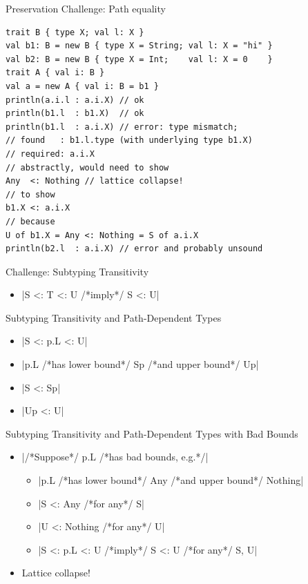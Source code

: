 \documentclass{beamer}
\begin{document}
\begin{frame}[fragile]{Preservation Challenge: Path equality}
\begin{verbatim}
trait B { type X; val l: X }
val b1: B = new B { type X = String; val l: X = "hi" }
val b2: B = new B { type X = Int;    val l: X = 0    }
trait A { val i: B }
val a = new A { val i: B = b1 }
println(a.i.l : a.i.X) // ok
println(b1.l  : b1.X)  // ok
println(b1.l  : a.i.X) // error: type mismatch;
// found   : b1.l.type (with underlying type b1.X)
// required: a.i.X
// abstractly, would need to show
Any  <: Nothing // lattice collapse!
// to show
b1.X <: a.i.X
// because
U of b1.X = Any <: Nothing = S of a.i.X
println(b2.l  : a.i.X) // error and probably unsound
\end{verbatim}
\end{frame}

\begin{frame}[fragile]{Challenge: Subtyping Transitivity}
\begin{itemize}
\item {}|S <: T <: U /*imply*/ S <: U|
\end{itemize}
\end{frame}

\begin{frame}[fragile]{Subtyping Transitivity and Path-Dependent Types}
\begin{itemize}
\item {}|S <: p.L <: U|
\item {}|p.L /*has lower bound*/ Sp /*and upper bound*/ Up|
\item {}|S  <: Sp|
\item {}|Up <: U|
\end{itemize}
\end{frame}

\begin{frame}[fragile]{Subtyping Transitivity and Path-Dependent Types with Bad Bounds}
\begin{itemize}
\item {}|/*Suppose*/ p.L /*has bad bounds, e.g.*/|
\begin{itemize}
\item {}|p.L /*has lower bound*/ Any /*and upper bound*/ Nothing|
\item {}|S  <: Any     /*for any*/ S|
\item {}|U  <: Nothing /*for any*/ U|
\item {}|S <: p.L <: U /*imply*/ S <: U /*for any*/ S, U|
\end{itemize}
\item Lattice collapse!
\end{itemize}
\end{frame}
\end{document}
